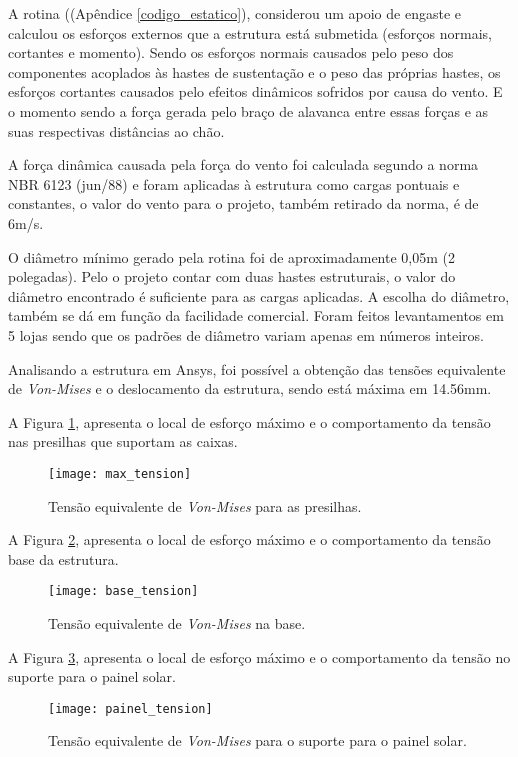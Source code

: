 A rotina ((Apêndice \ref{codigo_estatico}), considerou um apoio de engaste e calculou os esforços externos que a estrutura está submetida (esforços normais, cortantes e momento). Sendo os esforços normais causados pelo peso dos componentes acoplados às hastes de sustentação e o peso das próprias hastes, os esforços cortantes causados pelo efeitos dinâmicos sofridos por causa do vento. E o momento sendo a força gerada pelo braço de alavanca entre essas forças e as suas respectivas distâncias ao chão.


A força dinâmica causada pela força do vento foi calculada segundo a norma NBR 6123 (jun/88) \cite{vento} e foram aplicadas à estrutura como cargas pontuais e constantes, o valor do vento para o projeto, também retirado da norma, é de 6m/s.	

O diâmetro mínimo gerado pela rotina foi de aproximadamente 0,05m (2 polegadas). Pelo o projeto contar com duas hastes estruturais, o valor do diâmetro encontrado é suficiente para as cargas aplicadas. A escolha do diâmetro, também se dá em função da facilidade comercial. Foram feitos levantamentos em 5 lojas sendo que os padrões de diâmetro variam apenas em números inteiros.

Analisando a estrutura em Ansys, foi possível a obtenção das tensões equivalente de \textit{Von-Mises} e o deslocamento da estrutura, sendo está máxima em 14.56mm.

A Figura \ref{fig:maximo}, apresenta o local de esforço máximo e o comportamento da tensão nas presilhas que suportam as caixas.

\begin{figure}[h]
	\centering
    \texttt{[image: max\_tension]}
    \caption{Tensão equivalente de \textit{Von-Mises} para as presilhas.}
    \label{fig:maximo}
\end{figure}

A Figura \ref{fig:base}, apresenta o local de esforço máximo e o comportamento da tensão base da estrutura.

\begin{figure}[h]
	\centering
    \texttt{[image: base\_tension]}
    \caption{Tensão equivalente de \textit{Von-Mises} na base.}
    \label{fig:base}
\end{figure}

A Figura \ref{fig:painel}, apresenta o local de esforço máximo e o comportamento da tensão no suporte para o painel solar.

\begin{figure}[h]
	\centering
    \texttt{[image: painel\_tension]}
    \caption{Tensão equivalente de \textit{Von-Mises} para o suporte para o painel solar.}
    \label{fig:painel}
\end{figure}

